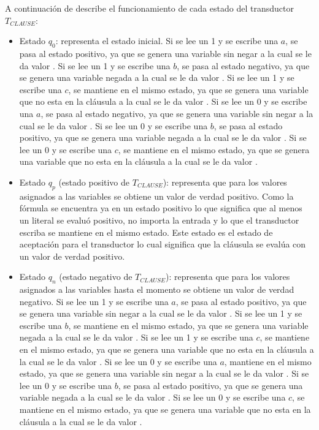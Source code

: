 A continuación de describe el funcionamiento de cada estado del transductor $T_{CLAUSE}$:
\begin{itemize}
    \item Estado $q_0$: representa el estado inicial.
          Si se lee  un 1 y se escribe una $a$, se pasa al estado positivo, ya que se genera una variable sin negar a la cual se le da valor \true{}.
          Si se lee  un 1 y se escribe una $b$, se pasa al estado negativo, ya que se genera una variable negada a la cual se le da valor \true{}.
          Si se lee  un 1 y se escribe una $c$, se mantiene en el mismo estado, ya que se genera una variable que no esta en la cláusula a la cual se le da valor \true{}.
          Si se lee  un 0 y se escribe una $a$, se pasa al estado negativo, ya que se genera una variable sin negar a la cual se le da valor \false{}.
          Si se lee  un 0 y se escribe una $b$, se pasa al estado positivo, ya que se genera una variable negada a la cual se le da valor \false{}.
          Si se lee  un 0 y se escribe una $c$, se mantiene en el mismo estado, ya que se genera una variable que no esta en la cláusula a la cual se le da valor \false{}.
          
    \item Estado $q_p$ (estado positivo de $T_{CLAUSE}$): representa que para los valores asignados a las variables se obtiene un valor de verdad positivo.  Como la fórmula se encuentra ya en un estado positivo lo que significa que al menos un literal se evaluó positivo, no importa la entrada y lo que el transductor escriba se mantiene en el mismo estado. Este estado es el estado de aceptación para el transductor lo cual significa que la cláusula se evalúa con un valor de verdad positivo.
          
    \item Estado $q_n$ (estado negativo de $T_{CLAUSE}$): representa que para los valores asignados a las variables hasta el momento se obtiene un valor de verdad negativo.
          Si se lee  un 1 y se escribe una $a$, se pasa al estado positivo, ya que se genera una variable sin negar a la cual se le da valor \true{}.
          Si se lee  un 1 y se escribe una $b$, se mantiene en el mismo estado, ya que se genera una variable negada a la cual se le da valor \true{}.
          Si se lee  un 1 y se escribe una $c$, se mantiene en el mismo estado, ya que se genera una variable que no esta en la cláusula a la cual se le da valor \true{}.
          Si se lee  un 0 y se escribe una $a$, mantiene en el mismo estado, ya que se genera una variable sin negar a la cual se le da valor \false{}.
          Si se lee  un 0 y se escribe una $b$, se pasa al estado positivo, ya que se genera una variable negada a la cual se le da valor \false{}.
          Si se lee  un 0 y se escribe una $c$, se mantiene en el mismo estado, ya que se genera una variable que no esta en la cláusula a la cual se le da valor \false{}.
          
\end{itemize}

